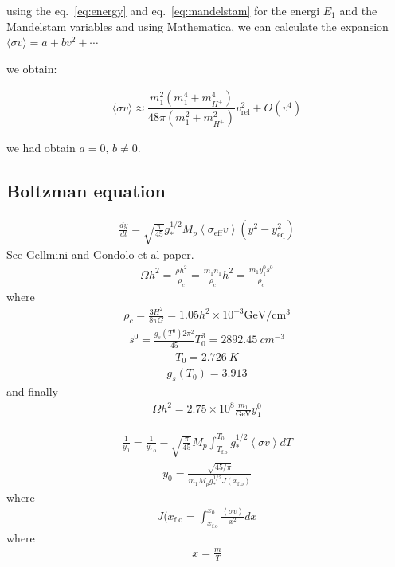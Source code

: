 \documentclass[12pt,letterpaper]{article}
\begin{document}
using the eq.~\eqref{eq:energy} and eq.~\eqref{eq:mandelstam} for the energi $E_1$ and the Mandelstam variables and using Mathematica, we can calculate the expansion $ \langle \sigma v \rangle =a+bv^2+ \cdots$

we obtain: 

\begin{align}
\langle \sigma v \rangle \approx \dfrac{m_1^2(m_1^4+m_{H^+}^4)}{48\pi(m_1^2+m_{H^+}^2)}v_{\text{rel}}^2 + O(v^4)
\end{align}

we had obtain $a=0$, $b\neq 0$. 

 \subsection{Boltzman equation}

\begin{align*}
  \frac{dy}{dt}=\sqrt{\frac{\pi}{45}}g_{*}^{1/2}M_p \left\langle \sigma_{\text{eff}}v \right\rangle
  \left( y^2-y_{\text{eq}}^2 \right)
\end{align*}
See Gellmini and Gondolo et al paper.
\begin{align*}
  \Omega h^2=\frac{\rho h^2}{\rho_c}=\frac{m_1 n_1}{\rho_c}h^2=\frac{m_1 y^0_1 s^0}{\rho_c}
\end{align*}
where
\begin{align*}
  \rho_c=\frac{3H^2}{8\pi G}=1.05 h^2\times 10^{-3} \text{GeV/cm${}^{3}$}
\end{align*}
\begin{align*}
  s^0=\frac{g_s(T^0)2\pi^2}{45}T_0^3=\SI{2892.45}{cm^{-3}}
\end{align*}
\begin{align*}
  T_0=\SI{2.726}{K}
\end{align*}
\begin{align*}
  g_s(T_0)=3.913
\end{align*}
and finally
\begin{align*}
  \Omega h^2=2.75\times 10^8 \frac{m_1}{\text{GeV}} y_1^0
\end{align*}


\begin{align*}
  \frac{1}{y_0}=\frac{1}{y_{\text{f.o}}}-\sqrt{\frac{\pi}{45}}M_p\int_{T_{\text{f.o}}}^{T_0}
   g_{*}^{1/2} \left\langle \sigma v \right\rangle dT
\end{align*}
\begin{align*}
  y_0=\frac{\sqrt{45/\pi}}{m_1 M_p g_{*}^{1/2} J(x_{\text{f.o}})}
\end{align*}
where
\begin{align*}
  J(x_{\text{f.o}}=\int_{x_{\text{f.o}}}^{x_0} \frac{\left\langle  \sigma v\right\rangle}{x^2}dx
\end{align*}
where
\begin{align*}
  x=\frac{m}{T}
\end{align*}
\end{document}

